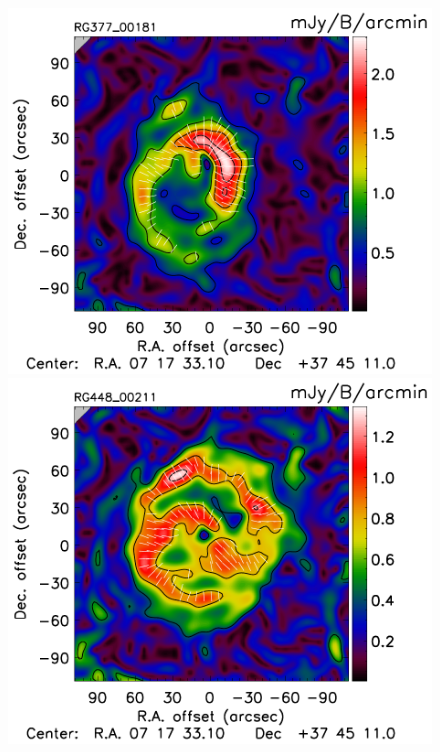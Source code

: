 \documentclass[twocolumn,traditabstract]{aa}
\begin{document}
\begin{figure}[h]
\includegraphics[trim=0cm 0.7cm 0cm 0cm, clip=true, totalheight=3.7cm]{Figure/Grad_RG377_00181_Ymap_zobs0p5_processed_15_15_45.pdf}
\includegraphics[trim=0cm 0.7cm 0cm 0cm, clip=true, totalheight=3.7cm]{Figure/Grad_RG448_00211_Ymap_zobs0p4_processed_15_15_45.pdf}

\end{figure}
\end{document}

